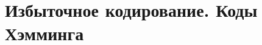 \documentclass[discrete.tex]{subfiles}
\begin{document}
\section{Избыточное кодирование. Коды Хэмминга}
\end{document}
